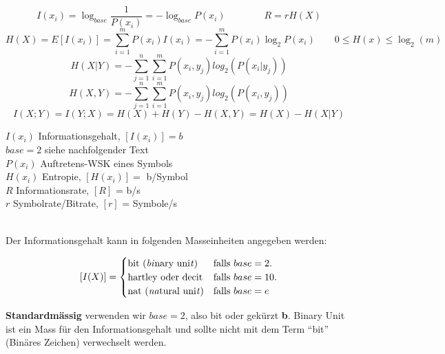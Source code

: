 \begin{minipage}[c]{13cm}
	$$ I(x_i) = \log_{base} \frac{1}{P(x_i)} = - \log_{base} P(x_i) \qquad \qquad  R = r H (X)$$ 	
	$$ H(X) = E[I(x_i)] = \sum\limits_{i=1}^m P(x_i) I(x_i) = - \sum\limits_{i=1}^m P(x_i)
	\log_2{P(x_i)} \qquad 0 \leq H(x) \leq \log_2(m)$$	
	$$ H(X|Y)=- \sum\limits_{j=1}^{n} \sum\limits_{i=1}^{m} P(x_i,y_j)
	log_2(P(x_i|y_j))$$
	$$ H(X,Y)=- \sum\limits_{j=1}^{n} \sum\limits_{i=1}^{m} P(x_i,y_j)
	log_2(P(x_i,y_j))$$
	$$I(X;Y)=I(Y;X)=H(X)+H(Y)-H(X,Y)=H(X)-H(X|Y)$$
\end{minipage}
\begin{minipage}[c]{7cm}
	$I(x_i)$ Informationsgehalt, $[I(x_i)] = b$ \\
	$base = 2$ siehe nachfolgender Text\\
	$P(x_i)$ Auftretens-WSK eines Symbols \\
	$H(x_i)$ Entropie, $[H(x_i)] = $ b/Symbol \\
	$R$ Informationsrate, $[R]$ = b/s  \\
	$r$ Symbolrate/Bitrate, $[r]$ = Symbole/s
\end{minipage} 
\vspace{0.1cm} \\
Der Informationsgehalt kann in folgenden Masseinheiten angegeben werden: \\
\begin{minipage}[c]{8cm}
$$ [I(X)] = \begin{cases}
            	\text{bit (\emph{bi}nary uni\emph{t})} 
            		& \text{falls } base=2. \\
            	\text{hartley oder decit}
            		& \text{falls } base=10. \\
            	\text{nat (\emph{na}tural uni\emph{t})} 
            		& \text{falls } base=e
			\end{cases} $$
\end{minipage}
\begin{minipage}[c]{11cm}
\textbf{Standardmässig} verwenden wir $base=2$, also bit oder gekürzt
\textbf{b}. Binary Unit ist ein Mass für den Informationsgehalt und sollte nicht mit dem Term ``bit'' (Binäres Zeichen) verwechselt
werden.
\end{minipage}


